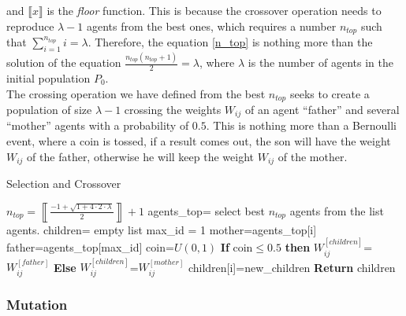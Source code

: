 \documentclass{iosart2c}
\begin{document}
and $\llbracket x\rrbracket$ is the \textit{floor} function. This is because the crossover operation needs to reproduce $\lambda-1$ agents from the best ones, which requires a number $n_{top}$ such that $\sum_{i=1}^{n_{top}} i=\lambda$. Therefore, the equation \ref{n_top} is nothing more than the solution of the equation $\frac{n_{top}(n_{top}+1)}{2}=\lambda$, where $\lambda$ is the number of agents in the initial population $P_0$. \\

The crossing operation we have defined from the best $n_{top}$ seeks to create a population of size $\lambda-1$  crossing the weights $W_{ij}$ of an agent ``father'' and several ``mother'' agents with a probability of $0.5$. This is nothing more than a Bernoulli event, where a coin is tossed, if a result comes out, the son will have the weight $W_{ij}$ of the father, otherwise he will keep the weight $W_{ij}$ of the mother.




\begin{algorithm}
\caption{Selection and Crossover}\label{selec_cross}
\begin{algorithmic}[1]
\State $n_{top}=\left\llbracket\frac{-1+\sqrt{1+4\cdot2\cdot\lambda}}{2}\right\rrbracket+1$
\State agents\_top= select best $n_{top}$ agents from the list agents.
\State children= empty list
\State max\_id = 1 
\State mother=agents\_top[i] 
\State father=agents\_top[max\_id] 
\State coin=$U(0,1)$ 
\State \textbf{If} coin$\leq0.5$ \textbf{then}
\State \hspace{0.5cm} $W_{ij}^{[children]}$=$W_{ij}^{[father]}$ 
\State \textbf{Else}
\State \hspace{0.5cm} $W_{ij}^{[children]}$=$W_{ij}^{[mother]}$ 
\EndFor
children[i]=new\_children
\EndFor
\EndWhile
\State \textbf{Return} children
\EndFunction
\end{algorithmic}
\end{algorithm}



\subsubsection{Mutation}
\end{document}

